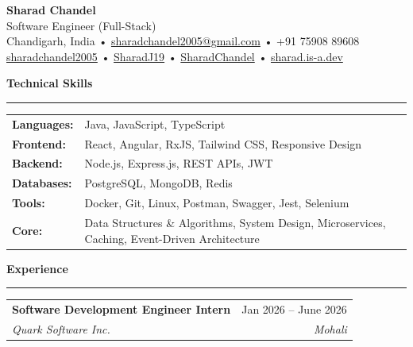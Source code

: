 \documentclass[10pt, letterpaper]{article}
\makeatletter
\newcommand{\resumesection}[1]{
\vspace{6pt}
{\large \textbf{\textcolor{accent}{#1}}}
\vspace{2pt}
\hrule
\vspace{4pt}
}
\newcommand{\experience}[4]{
\begin{tabularx}
	{\textwidth}{@{} X r @{}} \textbf{#1} & #2 \\ \textit{#3} & \textit{#4} \\
\end{tabularx}
}
\makeatother
\begin{document}
	\begin{center}
		{\Huge \textbf{Sharad Chandel}} \\[2pt] {\large Software Engineer (Full-Stack)}
		\\[4pt]

		 Chandigarh, India •  \href{mailto:sharadchandel2005@gmail.com}{sharadchandel2005@gmail.com}
		•  +91 75908 89608 \\

		 \href{https://linkedin.com/in/sharadchandel2005}{sharadchandel2005}
		•  \href{https://github.com/SharadJ19}{SharadJ19} • 
		\href{https://leetcode.com/u/SharadChandel/}{SharadChandel} • 
		\href{http://sharad.is-a.dev/}{sharad.is-a.dev}
	\end{center}

	\resumesection{Technical Skills}

	\begin{tabularx}
		{\textwidth}{@{}l X@{}} \textbf{Languages:} & Java, JavaScript, TypeScript \\
		\textbf{Frontend:} & React, Angular, RxJS, Tailwind CSS, Responsive Design
		\\ \textbf{Backend:} & Node.js, Express.js, REST APIs, JWT \\ \textbf{Databases:}
		& PostgreSQL, MongoDB, Redis \\ \textbf{Tools:} & Docker, Git, Linux, Postman,
		Swagger, Jest, Selenium \\ \textbf{Core:} & Data Structures \& Algorithms,
		System Design, Microservices, Caching, Event-Driven Architecture \\
	\end{tabularx}

	\resumesection{Experience}

	\experience{Software Development Engineer Intern}{Jan 2026 -- June 2026} {Quark Software Inc.}{Mohali}
\end{document}
